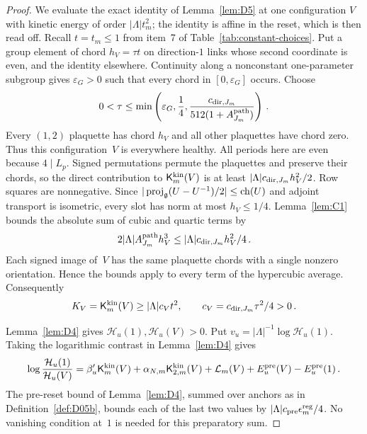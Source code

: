 \begin{proof}
We evaluate the exact identity of Lemma~\ref{lem:D5} at one configuration $V$ with kinetic energy of order $|\Lambda|t_m^2$; the identity is affine in the reset, which is then read off. Recall $t=t_m\le1$ from item~7 of Table~\ref{tab:constant-choices}. Put a group element of chord $h_V=\tau t$ on direction-$1$ links whose second coordinate is even, and the identity elsewhere. Continuity along a nonconstant one-parameter subgroup gives $\varepsilon_G>0$ such that every chord in $[0,\varepsilon_G]$ occurs. Choose
\begin{equation*}
0<\tau\le\min\left(\varepsilon_G,\frac14,
\frac{c_{{\rm dir},J_m}}{512(1+A_{J_m}^{\rm path})}\right)\,.
\end{equation*}
Every $(1,2)$ plaquette has chord $h_V$ and all other plaquettes have chord zero. Thus this configuration~$V$ is everywhere healthy. All periods here are even because $4\mid L_p$. Signed permutations permute the plaquettes and preserve their chords, so the direct contribution to $\mathsf K^{\rm kin}_m(V)$ is at least $|\Lambda|c_{{\rm dir},J_m}h_V^2/2$. Row squares are nonnegative. Since $|\operatorname{proj}_{\mathfrak{g}}(U-U^{-1})/2|\le\operatorname{ch}(U)$ and adjoint transport is isometric, every slot has norm at most $h_V\le1/4$. Lemma~\ref{lem:C1} bounds the absolute sum of cubic and quartic terms by
\begin{equation*}
2|\Lambda|A_{J_m}^{\rm path}h_V^3
\le |\Lambda|c_{{\rm dir},J_m}h_V^2/4\,.
\end{equation*}
Each signed image of~$V$ has the same plaquette chords with a single nonzero orientation. Hence the bounds apply to every term of the hypercubic average. Consequently
\begin{equation*}
K_V=\mathsf K^{\rm kin}_m(V)\ge|\Lambda|c_Vt^2,
\qquad c_V=c_{{\rm dir},J_m}\tau^2/4>0\,.
\end{equation*}

Lemma~\ref{lem:D4} gives $\mathcal H_u(1),\mathcal H_u(V)>0$. Put $v_u=|\Lambda|^{-1}\log \mathcal H_u(1)$. Taking the logarithmic contrast in Lemma~\ref{lem:D4} gives
\begin{equation}\label{eq:C-prereset}
\log\frac{\mathcal H_u(1)}{\mathcal H_u(V)}
=\beta'_u\mathsf K^{\rm kin}_m(V)+\alpha_{N,m}\mathsf K^{\rm kin}_{2,m}(V)
+\mathcal L_m(V)+E_u^{\rm pre}(V)-E_u^{\rm pre}(1)\,.
\end{equation}
The pre-reset bound of Lemma~\ref{lem:D4}, summed over anchors as in Definition~\ref{def:D05b}, bounds each of the last two values by $|\Lambda|c_{\rm pre}\epsilon_m^{\rm reg}/4$. No vanishing condition at~$1$ is needed for this preparatory sum.


\end{proof}
